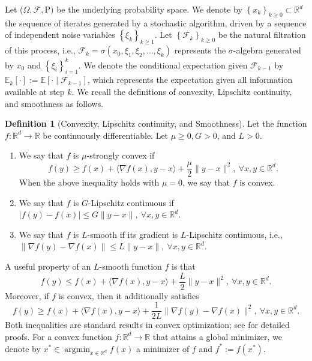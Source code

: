 \documentclass[10pt]{article}
\numberwithin{equation}{section}
\theoremstyle{definition}
\newtheorem{definition}{Definition}
\newcommand{\rbb}{\mathbb{R}}  %
\newcommand{\ebb}{\mathbb{E}}  %
\DeclareMathOperator*{\argmin}{arg min}
\begin{document}
Let ($\Omega, \mathcal{F}, \mathrm{P})$ be the underlying probability space. We denote by $\left\{x_k\right\}_{k \geq 0}\subset\rbb^d$ the sequence of iterates generated by a stochastic algorithm, driven by a sequence of independent noise variables $\left\{\xi_k\right\}_{k \geq 1}$. Let $\left\{\mathcal{F}_k\right\}_{k \geq 0}$ be the natural filtration of this process, i.e., $\mathcal{F}_k= \sigma\left(x_0, \xi_1, \xi_2, \ldots, \xi_k\right)$ represents the $\sigma$-algebra generated by $x_0$ and $\left\{\xi_i\right\}_{i=1}^k$. We denote the conditional expectation given $\mathcal{F}_{k-1}$ by $\ebb_k[\cdot]:=\ebb\left[\cdot \mid \mathcal{F}_{k-1}\right]$, which represents the expectation given all information available at step $k$.
We recall the definitions of convexity, Lipschitz continuity, and smoothness as follows.
\begin{definition}[Convexity, Lipschitz continuity, and Smoothness]
Let the function $f: \rbb^d \rightarrow \rbb$ be continuously differentiable. Let $\mu\geq0, G>0$, and $L>0$.
\begin{enumerate}
  \item[1).] We say that $f$ is $\mu$-strongly convex if
  \[
  f(y) \ge f(x) + \langle\nabla f(x), y-x\rangle+\frac{\mu}{2}\|y-x\|^2,~\forall x, y\in\rbb^d.
  \]
  When the above inequality holds with $\mu=0$, we say that $f$ is convex.
  \item[2).] We say that $f$ is $G$-Lipschitz continuous if
  $
  |f(y)-f(x)|\leq G\|y-x\|,~\forall x, y\in\rbb^d.
  $
  \item[3).] We say that $f$ is $L$-smooth if its gradient is $L$-Lipschitz continuous, i.e.,
  $
  \|\nabla f(y)-\nabla f(x)\|\leq L\|y-x\|,~\forall x, y\in\rbb^d.
  $
\end{enumerate}
\end{definition}
A useful property of an $L$-smooth function $f$ is that
\begin{equation*}
    f(y) \leq f(x) + \langle\nabla f(x), y-x\rangle + \frac{L}{2} \|y-x\|^2,~\forall x,y \in \mathbb{R}^d.
\end{equation*}
Moreover, if $f$ is convex, then it additionally satisfies
\begin{equation}\label{eq: cvx-L}
	f(y) \ge f(x) + \langle\nabla f(x), y-x\rangle +\frac{1}{2L}\|\nabla f(y)-\nabla f(x)\|^2,~\forall x,y \in \mathbb{R}^d.
\end{equation}
Both inequalities are standard results in convex optimization; see \citet{nesterov2003introductory} for detailed proofs.
For a convex function $f:\rbb^d \rightarrow \rbb$ that attains a global minimizer, we denote by $x^*\in\argmin_{x\in\rbb^d} f(x)$ a minimizer of $f$ and $f^*:=f(x^*)$.
\end{document}
